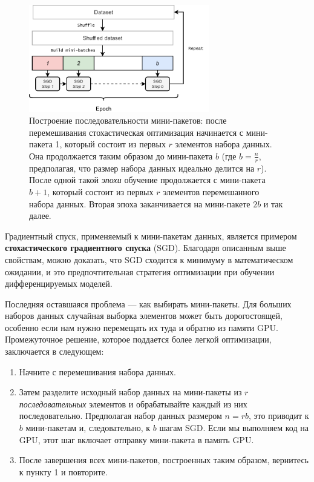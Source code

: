 \begin{figure}
    \centering
    \includegraphics[width=0.7\textwidth]{images/stochastic_optimization.pdf}
    \caption{Построение последовательности мини-пакетов: после перемешивания стохастическая оптимизация начинается с мини-пакета 1, который состоит из первых $r$ элементов набора данных. Она продолжается таким образом до мини-пакета $b$ (где $b = \frac{n}{r}$, предполагая, что размер набора данных идеально делится на $r$). После одной такой \textit{эпохи} обучение продолжается с мини-пакета $b+1$, который состоит из первых $r$ элементов перемешанного набора данных. Вторая эпоха заканчивается на мини-пакете $2b$ и так далее.}
    \label{fig:building_mini_batches}
\end{figure}

Градиентный спуск, применяемый к мини-пакетам данных, является примером \textbf{стохастического градиентного спуска} (SGD). Благодаря описанным выше свойствам, можно доказать, что SGD сходится к минимуму в математическом ожидании, и это предпочтительная стратегия оптимизации при обучении дифференцируемых моделей.

Последняя оставшаяся проблема — как выбирать мини-пакеты. Для больших наборов данных случайная выборка элементов может быть дорогостоящей, особенно если нам нужно перемещать их туда и обратно из памяти GPU. Промежуточное решение, которое поддается более легкой оптимизации, заключается в следующем:

\begin{enumerate}
    \item Начните с перемешивания набора данных.
    \item Затем разделите исходный набор данных на мини-пакеты из $r$ \textit{последовательных} элементов и обрабатывайте каждый из них последовательно. Предполагая набор данных размером $n=rb$, это приводит к $b$ мини-пакетам и, следовательно, к $b$ шагам SGD. Если мы выполняем код на GPU, этот шаг включает отправку мини-пакета в память GPU.
    \item После завершения всех мини-пакетов, построенных таким образом, вернитесь к пункту 1 и повторите.
\end{enumerate}

